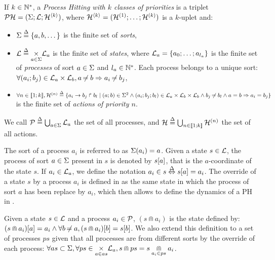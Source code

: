 \begin{definition}%
\label{def:ph}
  If $k \in \mathbb{N}^*$, a \emph{Process Hitting with $k$ classes of priorities} is a triplet $\mathcal{PH} = (\Sigma; \mathcal{L}; \mathcal{H}^{\langle k \rangle})$,
  where $\mathcal{H}^{\langle k \rangle} = (\mathcal{H}^{(1)}; \dots; \mathcal{H}^{(k)})$ is a $k$-uplet and:
  \begin{itemize}
    \item $\Sigma \stackrel{\Delta}= \{a,b,\dots\}$ is the finite set of \emph{sorts},
    \item $\mathcal{L} \stackrel{\Delta}= \underset{a \in \Sigma}{\times} \mathcal{L}_a$ is the finite set of \emph{states}, where $\mathcal{L}_a = \{a_0 ; \ldots ; a_{l_a}\}$ is the finite set of \emph{processes} of sort $a \in \Sigma$ and $l_a \in \mathbb{N}^*$. Each process belongs to a unique sort: $\forall (a_i; b_j) \in \mathcal{L}_a \times \mathcal{L}_b, a \not\nobreak\mkern -2mu = b \Rightarrow a_i \not\nobreak\mkern -2mu = b_j$,
    \item $\forall n \in \llbracket 1; k \rrbracket, \mathcal{H}^{(n)} \stackrel{\Delta}= \{a_i\rightarrow b_j\Rsh b_l \mid (a; b) \in \Sigma^2 \wedge (a_i; b_j; b_l) \in \mathcal{L}_a \times \mathcal{L}_b \times \mathcal{L}_b \wedge b_j \not\nobreak\mkern -2mu = b_l \wedge a = b \Rightarrow a_i = b_j \}$ is the finite set of \emph{actions of priority $n$}.
  \end{itemize}
  We call $\mathcal{P} \stackrel{\Delta}= \bigcup_{a \in \Sigma} \mathcal{L}_a$ the set of all processes, and $\mathcal{H} \stackrel{\Delta}= \bigcup_{n \in \llbracket 1; k \rrbracket} \mathcal{H}^{(n)}$ the set of all actions.
\end{definition}
\noindent
The sort of a process $a_i$ is referred to as $\Sigma(a_i) = a$.
Given a state $s\in \mathcal{L}$, the process of sort $a \in \Sigma$ present in $s$ is denoted by ${s[a]}$, that is the $a$-coordinate of the state $s$.
If $a_i \in \mathcal{L}_a$, we define the notation $a_i \in s \stackrel{\Delta}\Leftrightarrow {s[a]} = a_i$.
The override of a state $s$ by a process $a_i$ is defined in  as the same state in which the process of sort $a$ has been replace by $a_i$,
which then allows to define the dynamics of a PH in .
\begin{definition}[$\Cap : \PHl \times \PHproc \rightarrow \PHl$]
\label{def:statecap}
  Given a state $s \in \mathcal{L}$ and a process $a_i \in \mathcal{P}$, $(s \Cap a_i)$ is the state defined by:
  ${(s \Cap a_i)[a]} = a_i \wedge \forall b \not\nobreak\mkern -2mu = a, {(s \Cap a_i)[b]} = {s[b]}$.
  We also extend this definition to a set of processes $ps$ given that all processes are from different sorts by the override of each process:
  $\forall as \subset \Sigma, \forall ps \in \underset{a \in as}{\times} \mathcal{L}_a, s \Cap ps = s \underset{a_i \in ps}{\Cap} a_i$.
\end{definition}
